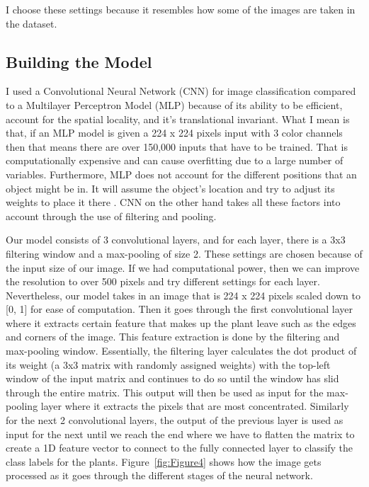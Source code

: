 \documentclass[man,floatsintext]{apa7}
\begin{document}
\begin{singlespace}
I choose these settings because it resembles how some of the images are taken in the dataset.

\subsection{Building the Model}
I used a Convolutional Neural Network (CNN) for image classification compared to a
Multilayer Perceptron Model (MLP) because of its ability to be efficient, account for the spatial locality, and it's translational invariant. What I mean is that, if an MLP model is given a 224 x 224 pixels input with 3 color channels then that means there are over 150,000 inputs that have to be trained. That is computationally expensive and can cause overfitting due to a large number of variables. Furthermore, MLP does not account for the different positions that an object might be in. It will assume the object's location and try to adjust its weights to place it there \parencite{stewart}. CNN on the other hand takes all these factors into account through the use of filtering and pooling.

Our model consists of 3 convolutional layers, and for each layer, there is a 3x3 filtering window and a max-pooling of size 2. These settings are chosen because of the input size of our image. If we had computational power, then we can improve the resolution to over 500 pixels and try different settings for each layer. Nevertheless, our model takes in an image that is 224 x 224 pixels scaled down to [0, 1] for ease of computation. Then it goes through the first convolutional layer where it extracts certain feature that makes up the plant leave such as the edges and corners of the image. This feature extraction is done by the filtering and max-pooling window. Essentially, the filtering layer calculates the dot product of its weight (a 3x3 matrix with randomly assigned weights) with the top-left window of the input matrix and continues to do so until the window has slid through the entire matrix. This output will then be used as input for the
max-pooling layer where it extracts the pixels that are most concentrated. Similarly for the next 2 convolutional layers, the output of the previous layer is used as input for the next until we reach the end where we have to flatten the matrix to create a 1D feature vector to connect to the fully connected layer to classify the class labels for the plants. Figure~\ref{fig:Figure4} shows how the image gets processed as it goes through the different stages of the neural network.


\end{singlespace}
\end{document}
